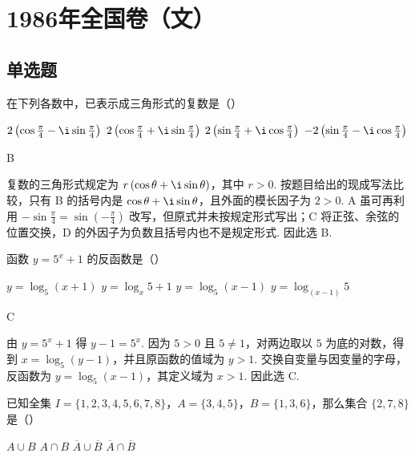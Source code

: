 \chapter{1986年全国卷（文）}

\section{单选题}

\begin{problem}
在下列各数中，已表示成三角形式的复数是（\quad）

\choices
    {\(2\left(\cos \frac{\pi}{4} - \i\sin \frac{\pi}{4}\right)\)}
    {\(2\left(\cos \frac{\pi}{4} + \i\sin \frac{\pi}{4}\right)\)}
    {\(2\left(\sin \frac{\pi}{4} + \i\cos \frac{\pi}{4}\right)\)}
    {\(-2\left(\sin \frac{\pi}{4} - \i\cos \frac{\pi}{4}\right)\)}
\end{problem}

\begin{answer}
B
\end{answer}

\begin{solution}
复数的三角形式规定为 \(r\left(\cos\theta+\i\sin\theta\right)\)，其中 \(r>0\). 按题目给出的现成写法比较，只有 B 的括号内是 \(\cos\theta+\i\sin\theta\)，且外面的模长因子为 \(2>0\). A 虽可再利用 \(-\sin\frac{\pi}{4}=\sin\left(-\frac{\pi}{4}\right)\) 改写，但原式并未按规定形式写出；C 将正弦、余弦的位置交换，D 的外因子为负数且括号内也不是规定形式. 因此选 B.
\end{solution}

\begin{problem}
函数 \(y = 5^x + 1\) 的反函数是（\quad）

\choices
    {\(y = \log_5(x + 1)\)}
    {\(y = \log_x 5 + 1\)}
    {\(y = \log_5(x - 1)\)}
    {\(y = \log_{\left(x - 1\right)} 5\)}
\end{problem}

\begin{answer}
C
\end{answer}

\begin{solution}
由 \(y=5^x+1\) 得 \(y-1=5^x\). 因为 \(5>0\) 且 \(5\neq1\)，对两边取以 \(5\) 为底的对数，得到 \(x=\log_5(y-1)\)，并且原函数的值域为 \(y>1\). 交换自变量与因变量的字母，反函数为 \(y=\log_5(x-1)\)，其定义域为 \(x>1\). 因此选 C.
\end{solution}

\begin{problem}
已知全集 \(I=\{1,2,3,4,5,6,7,8\}\)，\(A=\{3,4,5\}\)，\(B=\{1,3,6\}\)，那么集合 \(\{2,7,8\}\) 是（\quad）

\choices
    {\(A\cup B\)}
    {\(A\cap B\)}
    {\(\overline{A}\cup\overline{B}\)}
    {\(\overline{A}\cap\overline{B}\)}
\end{problem}

